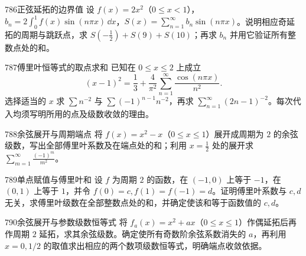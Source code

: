 \begin{exercise}{786}{正弦延拓的边界值}
设 $f(x)=2x^2$（$0\le x<1$），$b_n=2\int_0^1f(x)\sin(n\pi x)\,\dd x$，$S(x)=\sum_{n=1}^{\infty}b_n\sin(n\pi x)$。说明相应奇延拓的周期与跳跃点，求 $S(-\frac12)+S(9)+S(10)$；再求 $b_n$ 并用它验证所有整数点处的和。
\end{exercise}
\begin{exercise}{787}{傅里叶恒等式的取点求和}
已知在 $0\le x\le2$ 上成立
\[(x-1)^2=\frac13+\frac4{\pi^2}\sum_{n=1}^{\infty}\frac{\cos(n\pi x)}{n^2}.\]
选择适当的 $x$ 求 $\sum n^{-2}$ 与 $\sum(-1)^{n-1}n^{-2}$，再求 $\sum_{n=1}^{\infty}(2n-1)^{-2}$。每次代入均须写明所用的点及级数收敛的理由。
\end{exercise}
\begin{exercise}{788}{余弦展开与周期端点}
将 $f(x)=x^2-x$（$0\le x\le1$）展开成周期为 $2$ 的余弦级数，写出全部傅里叶系数及在端点处的和；利用 $x=\frac12$ 处的展开求 $\sum_{m=1}^{\infty}\frac{(-1)^m}{m^2}$。
\end{exercise}
\begin{exercise}{789}{单点赋值与傅里叶和}
设 $f$ 为周期 $2$ 的函数，在 $(-1,0)$ 上等于 $-1$，在 $(0,1)$ 上等于 $1$，并令 $f(0)=c,f(1)=f(-1)=d$。证明傅里叶系数与 $c,d$ 无关，求傅里叶级数在全部整数点处的和，并确定使该和等于函数值的 $c,d$。
\end{exercise}
\begin{exercise}{790}{余弦展开与参数级数恒等式}
将 $f_a(x)=x^2+ax$（$0\le x\le1$）作偶延拓后再作周期 $2$ 延拓，求其余弦级数。确定使所有奇数阶余弦系数消失的 $a$，再利用 $x=0,1/2$ 的取值求出相应的两个数项级数恒等式，明确端点收敛依据。
\end{exercise}

